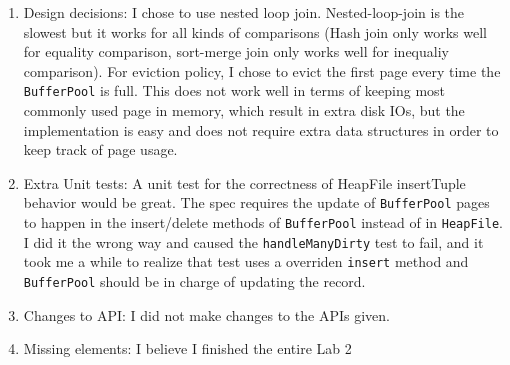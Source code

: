 \documentclass[10pt]{myland}
\begin{document}
\begin{enumerate}[label=\textbf{\arabic*.}, listparindent=0.0em, itemsep=2em]
\begin{center}
    \end{center}
    \newpage

    \item Design decisions: I chose to use nested loop join. Nested-loop-join is the slowest but it works for all kinds
        of comparisons (Hash join only works well for equality comparison, sort-merge join only works well for inequaliy
        comparison). For eviction policy, I chose to evict the first page every time the \texttt{BufferPool} is full.
        This does not work well in terms of keeping most commonly used page in memory, which result in extra disk IOs,
        but the implementation is easy and does not require extra data structures in order to keep track of page usage.

    \item Extra Unit tests: A unit test for the correctness of HeapFile insertTuple behavior would be great. The spec
        requires the update of \texttt{BufferPool} pages to happen in the insert/delete methods of \texttt{BufferPool}
        instead of in \texttt{HeapFile}. I did it the wrong way and caused the \texttt{handleManyDirty} test to fail, and
        it took me a while to realize that test uses a overriden \texttt{insert} method and \texttt{BufferPool} should
        be in charge of updating the record.

    \item Changes to API: I did not make changes to the APIs given.

    \item Missing elements: I believe I finished the entire Lab 2
\end{enumerate}
\end{document}
